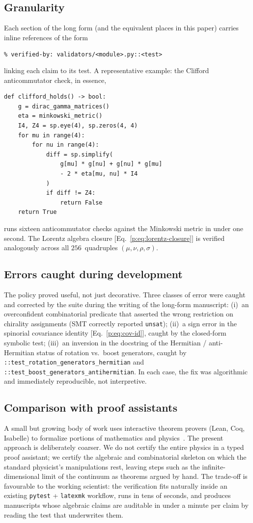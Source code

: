 \subsection{Granularity}
Each section of the long form (and the equivalent places in this paper)
carries inline references of the form
\begin{center}\small\texttt{\% verified-by: validators/\textless module\textgreater.py::\textless test\textgreater}\end{center}
linking each claim to its test. A representative example: the Clifford
anticommutator check, in essence,
\begin{verbatim}
def clifford_holds() -> bool:
    g = dirac_gamma_matrices()
    eta = minkowski_metric()
    I4, Z4 = sp.eye(4), sp.zeros(4, 4)
    for mu in range(4):
        for nu in range(4):
            diff = sp.simplify(
                g[mu] * g[nu] + g[nu] * g[mu]
                - 2 * eta[mu, nu] * I4
            )
            if diff != Z4:
                return False
    return True
\end{verbatim}
runs sixteen anticommutator checks against the Minkowski metric in
under one second. The Lorentz algebra closure
[Eq.~\eqref{p:eq:lorentz-closure}] is verified analogously across all
$256$~quadruples $(\mu,\nu,\rho,\sigma)$.

\subsection{Errors caught during development}
The policy proved useful, not just decorative. Three classes of error
were caught and corrected by the suite during the writing of the
long-form manuscript: (i)~an overconfident combinatorial predicate that
asserted the wrong restriction on chirality assignments
(SMT correctly reported \texttt{unsat}); (ii)~a sign error in the
spinorial covariance identity [Eq.~\eqref{p:eq:cov-id}], caught by the
closed-form symbolic test; (iii)~an inversion in the docstring of the
Hermitian / anti-Hermitian status of rotation vs.\ boost generators,
caught by \texttt{::test\_rotation\_generators\_hermitian} and
\texttt{::test\_boost\_generators\_antihermitian}. In each case, the
fix was algorithmic and immediately reproducible, not interpretive.

\subsection{Comparison with proof assistants}
A small but growing body of work uses interactive theorem provers
(Lean, Coq, Isabelle) to formalize portions of mathematics and
physics~\cite{Buzzard2022}. The present approach is deliberately
coarser. We do not certify the entire physics in a typed proof
assistant; we certify the algebraic and combinatorial skeleton on which
the standard physicist's manipulations rest, leaving steps such as the
infinite-dimensional limit of the continuum as theorems argued by hand.
The trade-off is favourable to the working scientist: the verification
fits naturally inside an existing \texttt{pytest} + \texttt{latexmk}
workflow, runs in tens of seconds, and produces manuscripts whose
algebraic claims are auditable in under a minute per claim by reading
the test that underwrites them.
